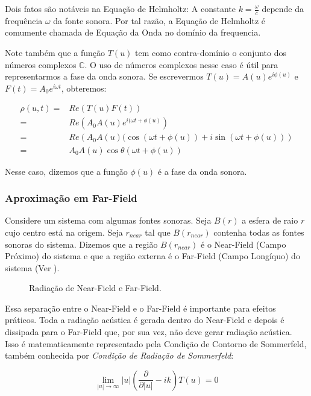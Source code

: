 Dois fatos são notáveis na Equação de Helmholtz: A constante $k = \frac{\omega}{c}$ depende da frequência $\omega$ da fonte sonora. Por tal razão, a Equação de Helmholtz é comumente chamada de Equação da Onda no domínio da frequencia.

Note também que a função $T(u)$ tem como contra-domínio o conjunto dos números complexos $\mathbb{C}$. O uso de números complexos nesse caso é útil para representarmos a fase da onda sonora. Se escrevermos $T(u) = A(u)e^{i\phi(u)}$ e $F(t) = A_0e^{i\omega t}$, obteremos:

\begin{eqnarray}
	\rho(u, t) =& Re\left( T(u)F(t) \right) \nonumber\\
	=& Re\left(A_0A(u) e^{i(\omega t + \phi(u)}\right) \nonumber\\
	=& Re\left(A_0A(u)(\cos (\omega t + \phi(u)) + i\sin (\omega t + \phi(u))\right) \nonumber\\
	=& A_0A(u)\cos \theta(\omega t + \phi(u))
\end{eqnarray}

Nesse caso, dizemos que a função $\phi(u)$ é a fase da onda sonora.

\subsubsection{Aproximação em Far-Field}

Considere um sistema com algumas fontes sonoras. Seja $B(r)$ a esfera de raio $r$ cujo centro está na origem. Seja $r_{near}$ tal que $B(r_{near})$ contenha todas as fontes sonoras do sistema. Dizemos que a região $B(r_{near})$ é o Near-Field (Campo Próximo) do sistema e que a região externa é o Far-Field (Campo Longíquo) do sistema (Ver ).

\begin{figure}[ht]
	\centering
	
	\caption[Radiação de Near-Field e Far-Field]{Radiação de Near-Field e Far-Field.}\label{fig:farfield}
\end{figure}

Essa separação entre o Near-Field e o Far-Field é importante para efeitos práticos. Toda a radiação acústica é gerada dentro do Near-Field e depois é dissipada para o Far-Field que, por sua vez, não deve gerar radiação acústica. Isso é matematicamente representado pela Condição de Contorno de Sommerfeld, também conhecida por \emph{Condição de Radiação de Sommerfeld}:

\begin{equation}
	\lim_{|u| \rightarrow \infty} |u| \left(\frac{\partial}{\partial |u|} - ik \right) T(u) = 0 \label{eq:sommerfeld_condition}
\end{equation}

